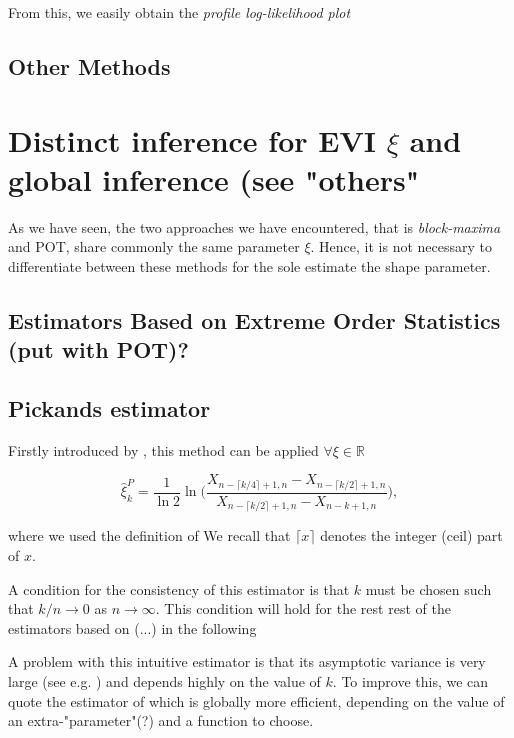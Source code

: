 \documentclass[11pt,a4paper,openany ]{book}
\begin{document}
From this, we easily obtain the \emph{profile log-likelihood plot} 


\subsection{Other Methods}\label{sec:gevother}

\section*{Distinct inference for EVI $\xi$ and global inference (see "others"}
\citet[pp.140]{beirlant_statistics_2006}


As we have seen, the two approaches we have encountered, that is \emph{block-maxima} and POT, share commonly the same parameter $\xi$. Hence, it is not necessary to differentiate between these methods for the sole estimate the shape parameter. 

\subsection{Estimators Based on Extreme Order Statistics (put with POT)?}

\subsection*{Pickands estimator}


Firstly introduced by \cite{pickands_statistical_1975}, this method can be applied $\forall\xi\in\mathbb{R}$

\begin{equation}
\hat{\xi}^P_{k}= \frac{1}{\ln 2}\ln \Bigg(\frac{X_{n-\lceil k/4\rceil +1,n}-X_{n-\lceil k/2\rceil+1,n}}{X_{n-\lceil k/2\rceil +1,n}-X_{n-k+1,n}}\Bigg),
\end{equation}

where we used the definition of \citet{beirlant_statistics_2006}
We recall that $\lceil x\rceil$ denotes the integer (ceil) part of $x$.

A condition for the consistency of this estimator is that $k$ must be chosen such that $k/n\rightarrow 0$ as $n\rightarrow \infty$. This condition will hold for the rest rest of the estimators based on (...) in the following 

A problem with this intuitive estimator is that its asymptotic variance is very large (see e.g. \cite{dekkers_estimation_1989}) and depends highly on the value of $k$. To improve this, we can quote the estimator of \cite{segers_generalized_2001} which is globally more efficient, depending on the value of an extra-"parameter"(?) and a function to choose.
\end{document}
